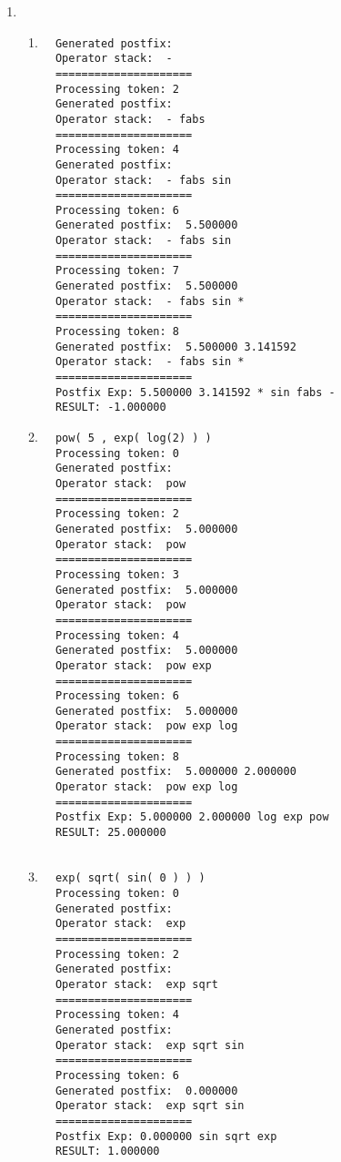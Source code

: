 \documentclass[fleqn,a4paper,12pt]{article}
\begin{document}
\begin{enumerate}
   \item
     \begin{enumerate}
     \item
       \begin{lstlisting}
  Generated postfix: 
  Operator stack:  -
  =====================
  Processing token: 2
  Generated postfix: 
  Operator stack:  - fabs
  =====================
  Processing token: 4
  Generated postfix: 
  Operator stack:  - fabs sin
  =====================
  Processing token: 6
  Generated postfix:  5.500000
  Operator stack:  - fabs sin
  =====================
  Processing token: 7
  Generated postfix:  5.500000
  Operator stack:  - fabs sin *
  =====================
  Processing token: 8
  Generated postfix:  5.500000 3.141592
  Operator stack:  - fabs sin *
  =====================
  Postfix Exp: 5.500000 3.141592 * sin fabs -
  RESULT: -1.000000
       \end{lstlisting}

     \item
       \begin{lstlisting}
  pow( 5 , exp( log(2) ) )
  Processing token: 0
  Generated postfix: 
  Operator stack:  pow
  =====================
  Processing token: 2
  Generated postfix:  5.000000
  Operator stack:  pow
  =====================
  Processing token: 3
  Generated postfix:  5.000000
  Operator stack:  pow
  =====================
  Processing token: 4
  Generated postfix:  5.000000
  Operator stack:  pow exp
  =====================
  Processing token: 6
  Generated postfix:  5.000000
  Operator stack:  pow exp log
  =====================
  Processing token: 8
  Generated postfix:  5.000000 2.000000
  Operator stack:  pow exp log
  =====================
  Postfix Exp: 5.000000 2.000000 log exp pow
  RESULT: 25.000000
  
      \end{lstlisting}

    \item
      \begin{lstlisting}
  exp( sqrt( sin( 0 ) ) )
  Processing token: 0
  Generated postfix: 
  Operator stack:  exp
  =====================
  Processing token: 2
  Generated postfix: 
  Operator stack:  exp sqrt
  =====================
  Processing token: 4
  Generated postfix: 
  Operator stack:  exp sqrt sin
  =====================
  Processing token: 6
  Generated postfix:  0.000000
  Operator stack:  exp sqrt sin
  =====================
  Postfix Exp: 0.000000 sin sqrt exp
  RESULT: 1.000000
      \end{lstlisting}
      
    \end{enumerate}
\end{enumerate}
\\
\end{document}
